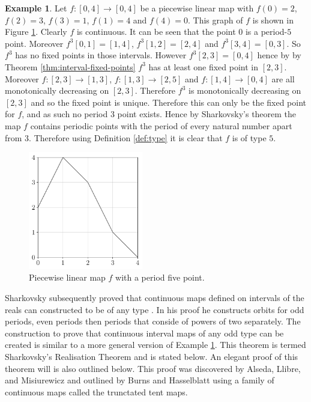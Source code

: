 \documentclass[11pt,a4paper,oneside]{memoir}
\theoremstyle{plain}
\theoremstyle{definition}
\newtheorem{exmp}[thm]{Example}
\begin{document}
\begin{exmp} \label{exmp:piecewise_sharkovsky}
    Let $f: [0, 4] \to [0, 4]$ be a piecewise linear map with $f(0) = 2$, $f(2) = 3$, $f(3) = 1$, $f(1) = 4$ and $f(4) = 0$. This graph of $f$ is shown in Figure \ref{fig:piecewise_linear}. Clearly $f$ is continuous. It can be seen that the point 0 is a period-$5$ point. Moreover $f^3[0, 1] = [1, 4]$, $f^3[1, 2] = [2, 4]$ and $f^3[3, 4] = [0, 3]$. So $f^3$ has no fixed points in those intervals. However $f^3[2, 3] = [0, 4]$ hence by by Theorem \ref{thm:interval-fixed-points} $f^3$ has at least one fixed point in $[2, 3]$. Moreover $f: [2, 3] \to [1, 3]$, $f: [1, 3] \to [2, 5]$ and $f: [1, 4] \to [0, 4]$ are all monotonically decreasing on $[2, 3]$. Therefore $f^3$ is monotonically decreasing on $[2, 3]$ and so the fixed point is unique. Therefore this can only be the fixed point for $f$, and as such no period 3 point exists. Hence by Sharkovsky's theorem the map $f$ contains periodic points with the period of every natural number apart from 3. Therefore using Definition \ref{def:type} it is clear that $f$ is of type $5$.

    \begin{figure}[h]
        \centering
        \includegraphics[width=5cm]{piecewise_0_4}
        \caption{Piecewise linear map $f$ with a period five point.}
        \label{fig:piecewise_linear}
    \end{figure}

\end{exmp}

Sharkovsky subsequently proved that continuous maps defined on intervals of the reals can constructed to be of any type \cite{sharkovsky} \cite{sharkovsky2}. In his proof he constructs orbits for odd periods, even periods then periods that conside of powers of two separately. The construction to prove that continuous interval maps of any odd type can be created is similar to a more general version of Example \ref{exmp:piecewise_sharkovsky}. This theorem is termed Sharkovsky's Realisation Theorem and is stated below. An elegant proof of this theorem will is also outlined below. This proof was discovered by Alseda, Llibre, and Misiurewicz \cite[Section 2.2]{alm} and outlined by Burns and Hasselblatt \cite[Section 7]{burns-hasselblatt} using a family of continuous maps called the trunctated tent maps.
\end{document}
